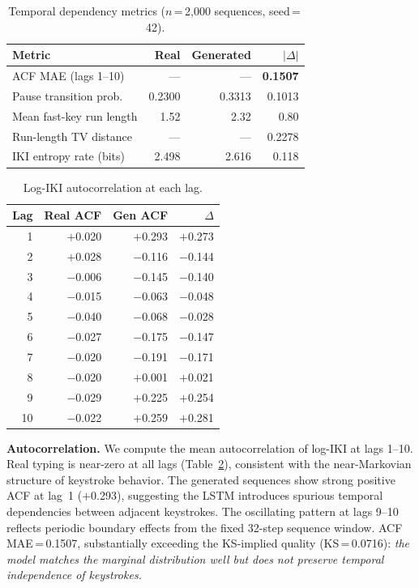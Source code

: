 \documentclass[sigconf,nonacm]{acmart}
\begin{document}
\begin{table}[t]
\centering
\caption{Temporal dependency metrics ($n$\,=\,2{,}000 sequences, seed\,=\,42).}
\begin{tabular}{lrrr}
\toprule
Metric & Real & Generated & $|\Delta|$ \\
\midrule
ACF MAE (lags 1--10)           & —      & —      & \textbf{0.1507} \\
Pause transition prob.         & 0.2300 & 0.3313 & 0.1013 \\
Mean fast-key run length       & 1.52   & 2.32   & 0.80 \\
Run-length TV distance         & —      & —      & 0.2278 \\
IKI entropy rate (bits)        & 2.498  & 2.616  & 0.118 \\
\bottomrule
\end{tabular}
\label{tab:temporal}
\end{table}

\begin{table}[t]
\centering\small
\caption{Log-IKI autocorrelation at each lag.}
\begin{tabular}{rrrr}
\toprule
Lag & Real ACF & Gen ACF & $\Delta$ \\
\midrule
1  & $+$0.020 & $+$0.293 & $+$0.273 \\
2  & $+$0.028 & $-$0.116 & $-$0.144 \\
3  & $-$0.006 & $-$0.145 & $-$0.140 \\
4  & $-$0.015 & $-$0.063 & $-$0.048 \\
5  & $-$0.040 & $-$0.068 & $-$0.028 \\
6  & $-$0.027 & $-$0.175 & $-$0.147 \\
7  & $-$0.020 & $-$0.191 & $-$0.171 \\
8  & $-$0.020 & $+$0.001 & $+$0.021 \\
9  & $-$0.029 & $+$0.225 & $+$0.254 \\
10 & $-$0.022 & $+$0.259 & $+$0.281 \\
\bottomrule
\end{tabular}
\label{tab:acf}
\end{table}

\textbf{Autocorrelation.}
We compute the mean autocorrelation of log-IKI at lags 1--10.
Real typing is near-zero at all lags (Table~\ref{tab:acf}), consistent
with the near-Markovian structure of keystroke behavior.
The generated sequences show strong positive ACF at lag~1 ($+$0.293),
suggesting the LSTM introduces spurious temporal dependencies between
adjacent keystrokes.
The oscillating pattern at lags 9--10 reflects periodic boundary effects
from the fixed 32-step sequence window.
ACF MAE\,=\,0.1507, substantially exceeding the KS-implied quality
(KS\,=\,0.0716): \emph{the model matches the marginal distribution well
but does not preserve temporal independence of keystrokes.}
\end{document}
